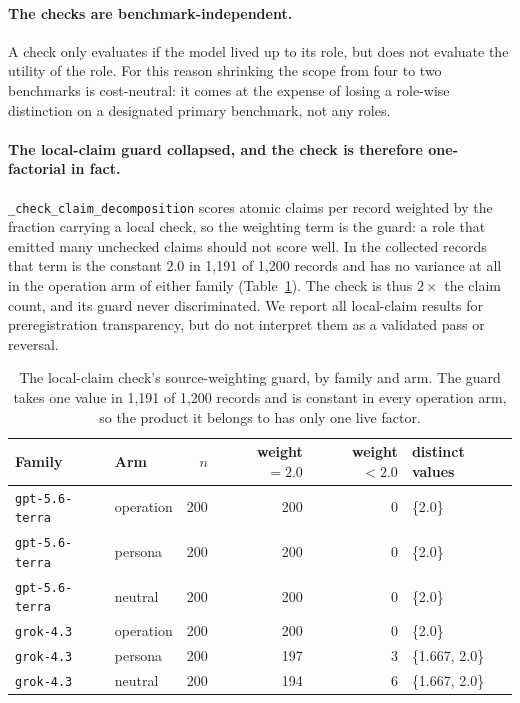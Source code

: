 \paragraph{The checks are benchmark-independent.}
A check only evaluates if the model lived up to its role, but does not evaluate the utility of the
role. For this reason shrinking the scope from four to two benchmarks is cost-neutral: it comes at
the expense of losing a role-wise distinction on a designated primary benchmark, not any roles.

\paragraph{The local-claim guard collapsed, and the check is therefore one-factorial in fact.}
\texttt{\_check\_claim\_decomposition} scores atomic claims per record weighted by the fraction
carrying a local check, so the weighting term is the guard: a role that emitted many unchecked
claims should not score well. In the collected records that term is the constant 2.0 in 1,191 of
1,200 records and has no variance at all in the operation arm of either family
(Table~\ref{tab:localclaim-guard}). The check is thus $2\times$ the claim count, and its guard never
discriminated. We report all local-claim results for preregistration transparency, but do not
interpret them as a validated pass or reversal.

\begin{table}[h]
\centering
\small
\begin{tabular}{llrrrl}
\toprule
Family & Arm & $n$ & weight $= 2.0$ & weight $< 2.0$ & distinct values \\
\midrule
\texttt{gpt-5.6-terra} & operation & 200 & 200 & 0 & \{2.0\} \\
\texttt{gpt-5.6-terra} & persona   & 200 & 200 & 0 & \{2.0\} \\
\texttt{gpt-5.6-terra} & neutral   & 200 & 200 & 0 & \{2.0\} \\
\texttt{grok-4.3}      & operation & 200 & 200 & 0 & \{2.0\} \\
\texttt{grok-4.3}      & persona   & 200 & 197 & 3 & \{1.667, 2.0\} \\
\texttt{grok-4.3}      & neutral   & 200 & 194 & 6 & \{1.667, 2.0\} \\
\bottomrule
\end{tabular}
\caption{The local-claim check's source-weighting guard, by family and arm. The guard takes one value
in 1,191 of 1,200 records and is constant in every operation arm, so the product it belongs to has
only one live factor.}
\label{tab:localclaim-guard}
\end{table}

